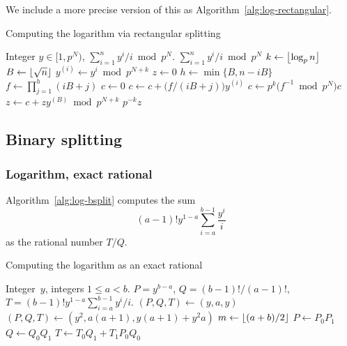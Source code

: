 We include a more precise version of this as 
Algorithm~\ref{alg:log-rectangular}.

\begin{algorithm}
\caption{Computing the logarithm via rectangular splitting}
\label{alg:log-rectangular}
\begin{algorithmic}
\vspace{1mm}
\Require Integer $y \in [1,p^N)$, 
\Ensure  $\sum_{i=1}^n y^i / i \bmod{p^N}$.
\Return $\sum_{i=1}^{n} y^i / i \bmod{p^N}$
\Else
\State $k \gets \left\lfloor\log_p n\right\rfloor$
\State $B \gets \left\lfloor\sqrt{n}\right\rfloor$
\State $y^{(i)} \gets y^i \bmod {p^{N + k}}$
\EndFor
\State $z \gets 0$
\State $h \gets \min\{ B, n - iB \}$
\State $f \gets \prod_{j=1}^{h} (iB + j)$
\State $c \gets 0$
\State $c \gets c + \bigl(f / (iB + j)\bigr) y^{(i)}$
\EndFor
\State $c \gets p^k \bigl(f^{-1} \bmod {p^N}\bigr) c$
\State $z \gets c + z y^{(B)} \bmod{p^{N+k}}$
\EndFor
\Return $p^{-k} z$
\EndIf
\EndProcedure
\end{algorithmic}
\end{algorithm}

\subsection{Binary splitting}

\subsubsection{Logarithm, exact rational}

Algorithm~\ref{alg:log-bsplit} computes the sum 
\begin{equation}
(a-1)! y^{1-a} \sum_{i=a}^{b-1} \frac{y^i}{i}
\end{equation}
as the rational number $T/Q$.

\begin{algorithm}
\caption{Computing the  logarithm as an exact rational}
\label{alg:log-bsplit}
\begin{algorithmic}
\vspace{1mm}
\Require Integer~$y$, integers $1 \leq a < b$.
\Ensure  $P = y^{b-a}$, $Q = (b-1)! / (a-1)!$, $T = (b-1)! y^{1-a} \sum_{i=a}^{b-1} y^i / i$.
\State $(P, Q, T) \gets (y, a, y)$
\State $(P, Q, T) \gets (y^2, a (a + 1), y (a + 1) + y^2 a)$
\Else
\State $m \gets \left\lfloor(a + b) / 2\right\rfloor$
\State {}
\State {}
\State $P \gets P_0 P_1$
\State $Q \gets Q_0 Q_1$
\State $T \gets T_0 Q_1 + T_1 P_0 Q_0$
\EndIf
\EndProcedure
\end{algorithmic}
\end{algorithm}

